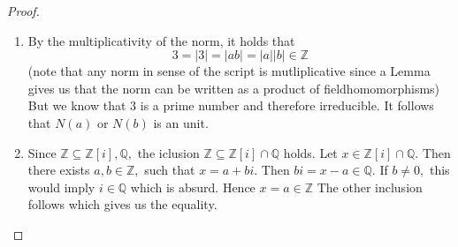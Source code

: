 \documentclass[10pt,a4paper]{article}
\newcommand{\QQ}{\mathbb{Q}}
\newcommand{\ZZ}{\mathbb{Z}}
\begin{document}
\begin{proof}
\begin{enumerate}[label = (\roman*)]
			\[(2+i)(2-i) = (4+1) + i\cdot 0 = 5\]
			\item By the multiplicativity of the norm, it holds that
			\[3 = |3| = |ab| = |a||b|\in \ZZ\]
			(note that any norm in sense of the script is mutliplicative since a Lemma gives us that the norm can be written as a product of fieldhomomorphisms)
			But we know that $3$ is a prime number and therefore irreducible. It follows that $N(a)$ or $N(b)$ is an unit.
			\item Since $\ZZ\subseteq \ZZ[i], \QQ,$ the iclusion $\ZZ\subseteq \ZZ[i]\cap \QQ$ holds. Let $x\in \ZZ[i]\cap \QQ.$ Then there exists $a,b\in \ZZ,$ such that $x = a+bi.$ Then $bi = x-a\in \QQ.$ If $b\neq 0,$ this would imply $i\in \QQ$ which is absurd. Hence $x = a\in \ZZ$ The other inclusion follows which gives us the equality.
		\end{enumerate}
	\end{proof}
	\pagebreak
\end{document}
